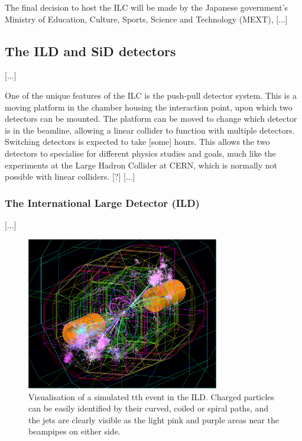The final decision to host the ILC will be made by the Japanese government's Ministry of Education, Culture, Sports, Science and Technology (MEXT), [...]

\subsection{The ILD and SiD detectors}
[...]

One of the unique features of the ILC is the push-pull detector system. This is a moving platform in the chamber housing the interaction point, upon which two detectors can be mounted. The platform can be moved to change which detector is in the beamline, allowing a linear collider to function with multiple detectors. Switching detectors is expected to take [some] hours. This allows the two detectors to specialise for different physics studies and goals, much like the experiments at the Large Hadron Collider at CERN, which is normally not possible with linear colliders. [?] [...]

\subsubsection{The International Large Detector (ILD)}
[...]

\begin{figure}[h]
	\centering
	\includegraphics[width=0.75\textwidth]{../Pictures/SimulatedEvent1.png}
	\caption{Visualisation of a simulated tth event in the ILD. Charged particles can be easily identified by their curved, coiled or spiral paths, and the jets are clearly visible as the light pink and purple areas near the beampipes on either side.}
	\label{figure:colliders/ILD/tth-simulation}
\end{figure}

